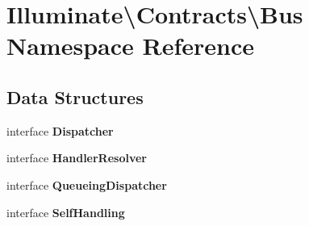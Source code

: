 \section{Illuminate\textbackslash{}Contracts\textbackslash{}Bus Namespace Reference}
\label{namespace_illuminate_1_1_contracts_1_1_bus}
\subsection*{Data Structures}
\begin{DoxyCompactItemize}
\item 
interface {\bf Dispatcher}
\item 
interface {\bf Handler\+Resolver}
\item 
interface {\bf Queueing\+Dispatcher}
\item 
interface {\bf Self\+Handling}
\end{DoxyCompactItemize}
